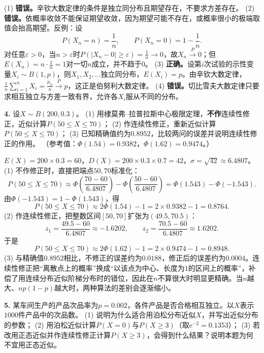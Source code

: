 \ifshowsolutions%
(1) \textbf{错误。}辛钦大数定律的条件是独立同分布且期望存在，不要求方差存在。
(2) \textbf{错误。}依概率收敛不能保证期望收敛，因为期望可能不存在，或概率很小的极端取值会抬高期望。反例：设
\[
P(X_n=n)=\frac1n,\qquad P(X_n=0)=1-\frac1n.
\]
对任意$\varepsilon>0$，当$n>\varepsilon$时$P(|X_n-0|\geq\varepsilon)=\frac1n\to0$，故$X_n\overset{P}{\longrightarrow}0$；但$E(X_n)=n\cdot\frac1n=1$对一切$n$成立，并不趋于$0$。
(3) \textbf{正确。}设第$i$次试验的示性变量$X_i\sim B(1,p)$，则$X_1,X_2,\ldots$独立同分布，$E(X_i)=p$。由辛钦大数定律，$\frac1n\sum_{i=1}^{n}X_i=\frac{\mu_n}{n}\overset{P}{\longrightarrow}p$，这正是伯努利大数定律。
(4) \textbf{错误。}切比雪夫大数定律只要求相互独立与方差一致有界，允许各$X_i$服从不同的分布。
\par\noindent{}

\vspace{0.4cm}

\else \answerarea[10] \fi%
%
\textbf{4.} 设$X\sim B(200,0.3)$。
(1) 用棣莫弗--拉普拉斯中心极限定理，\textbf{不作}连续性修正，近似计算$P(50\leq X\leq70)$；
(2) 作连续性修正，重新近似计算$P(50\leq X\leq70)$；
(3) 已知精确值约为$0.8952$，比较两问的误差并说明连续性修正的作用。
（参考值：$\Phi(1.54)=0.9382$，$\Phi(1.62)=0.9474$。）

\ifshowsolutions%
$E(X)=200\times0.3=60$，$D(X)=200\times0.3\times0.7=42$，$\sigma=\sqrt{42}\approx6.4807$。
(1) 不作修正时，直接把端点$50,70$标准化：
\[
P(50\leq X\leq70)\approx\Phi\!\left(\frac{70-60}{6.4807}\right)-\Phi\!\left(\frac{50-60}{6.4807}\right)
=\Phi(1.543)-\Phi(-1.543).
\]
由$\Phi(-1.543)=1-\Phi(1.543)$，得
\[
P(50\leq X\leq70)\approx2\Phi(1.54)-1=2\times0.9382-1=0.8764.
\]
(2) 作连续性修正，把整数区间$[50,70]$扩张为$(49.5,70.5)$：
\[
z_1=\frac{49.5-60}{6.4807}\approx-1.6202,\qquad
z_2=\frac{70.5-60}{6.4807}\approx1.6202.
\]
于是
\[
P(50\leq X\leq70)\approx2\Phi(1.62)-1=2\times0.9474-1=0.8948.
\]
(3) 与精确值$0.8952$相比，不修正的误差约为$0.0188$，修正后的误差约为$0.0004$。连续性修正把“离散点上的概率”换成“以该点为中心、长度为$1$的区间上的概率”，补偿了用连续分布近似阶梯分布时的错位，因此在$n$不算很大时明显更精确。当$n$越大、$np(1-p)$越大时，两种算法的差别会逐渐缩小。
\par\noindent{}

\vspace{0.4cm}

\else \answerarea[10] \fi%
%
\textbf{5.} 某车间生产的产品次品率为$p=0.002$，各件产品是否合格相互独立。以$X$表示$1000$件产品中的次品数。
(1) 说明为什么适合用泊松分布近似$X$，并写出近似分布的参数；
(2) 用泊松近似计算$P(X=0)$与$P(X\geq3)$（取$\mathrm{e}^{-2}=0.1353$）；
(3) 若改用正态近似并作连续性修正计算$P(X\geq3)$，会得到什么结果？说明本题为何不宜用正态近似。

